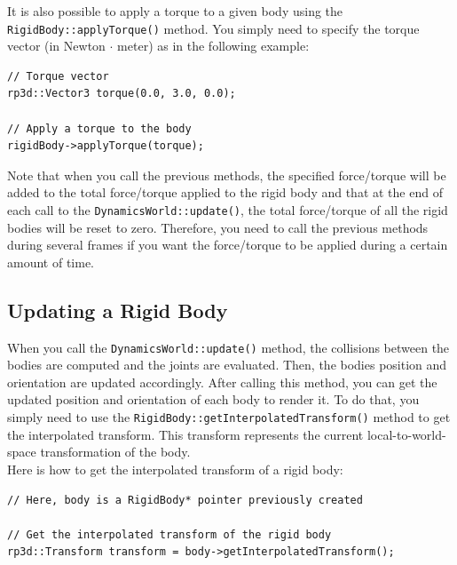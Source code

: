 \documentclass[a4paper,12pt]{article}
\begin{document}
     \begin{sloppypar}
        It is also possible to apply a torque to a given body using the \texttt{RigidBody::applyTorque()} method. You simply need to specify the torque vector (in Newton $\cdot$ meter) as
        in the following example: \\
     \end{sloppypar}

    \begin{lstlisting}
// Torque vector
rp3d::Vector3 torque(0.0, 3.0, 0.0);

// Apply a torque to the body
rigidBody->applyTorque(torque);
  \end{lstlisting}

    \vspace{0.6cm}

    Note that when you call the previous methods, the specified force/torque will be added to the total force/torque applied to the rigid body and that at the end of each call to the
    \texttt{DynamicsWorld::update()}, the total force/torque of all the rigid bodies will be reset to zero. Therefore, you need to call the previous methods during several frames
    if you want the force/torque to be applied during a certain amount of time.

    \subsection{Updating a Rigid Body}

    When you call the \texttt{DynamicsWorld::update()} method, the collisions between the bodies are computed and the joints are evaluated. Then, the bodies position
    and orientation
    are updated accordingly. After calling this method, you can get the updated position and orientation of each body to render it. To do that, you simply need to use the
    \texttt{RigidBody::getInterpolatedTransform()} method to get the interpolated transform. This transform represents the current local-to-world-space transformation
    of the body. \\

    Here is how to get the interpolated transform of a rigid body: \\

    \begin{lstlisting}
// Here, body is a RigidBody* pointer previously created

// Get the interpolated transform of the rigid body
rp3d::Transform transform = body->getInterpolatedTransform();
  \end{lstlisting}
\end{document}
